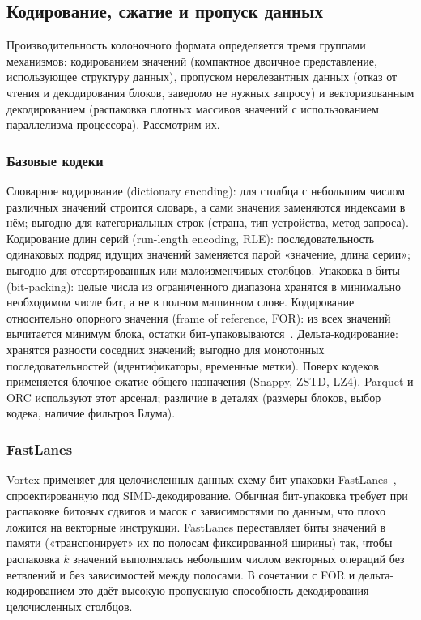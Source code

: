 \subsection{Кодирование, сжатие и пропуск данных}

Производительность колоночного формата определяется тремя группами механизмов:
кодированием значений (компактное двоичное представление, использующее структуру
данных), пропуском нерелевантных данных (отказ от чтения и декодирования блоков,
заведомо не нужных запросу) и векторизованным декодированием (распаковка плотных
массивов значений с использованием параллелизма процессора). Рассмотрим их.

\subsubsection{Базовые кодеки}

Словарное кодирование (dictionary encoding): для столбца с небольшим числом
различных значений строится словарь, а сами значения заменяются индексами в нём;
выгодно для категориальных строк (страна, тип устройства, метод запроса).
Кодирование длин серий (run-length encoding, RLE): последовательность одинаковых
подряд идущих значений заменяется парой «значение, длина серии»; выгодно для
отсортированных или малоизменчивых столбцов. Упаковка в биты (bit-packing): целые
числа из ограниченного диапазона хранятся в минимально необходимом числе бит, а
не в полном машинном слове. Кодирование относительно опорного значения (frame of
reference, FOR): из всех значений вычитается минимум блока, остатки
бит-упаковываются~\cite{zukowski2006superscalar, lemire2015decoding}.
Дельта-кодирование: хранятся разности соседних значений; выгодно для монотонных
последовательностей (идентификаторы, временные метки). Поверх кодеков применяется
блочное сжатие общего назначения (Snappy, ZSTD, LZ4). Parquet и ORC используют
этот арсенал; различие в деталях (размеры блоков, выбор кодека, наличие фильтров
Блума).

\subsubsection{FastLanes}

Vortex применяет для целочисленных данных схему бит-упаковки
FastLanes~\cite{afroozeh2023fastlanes}, спроектированную под SIMD-декодирование.
Обычная бит-упаковка требует при распаковке битовых сдвигов и масок с зависимостями
по данным, что плохо ложится на векторные инструкции. FastLanes переставляет биты
значений в памяти («транспонирует» их по полосам фиксированной ширины) так, чтобы
распаковка \(k\) значений выполнялась небольшим числом векторных операций без
ветвлений и без зависимостей между полосами. В сочетании с FOR и дельта-кодированием
это даёт высокую пропускную способность декодирования целочисленных столбцов.

